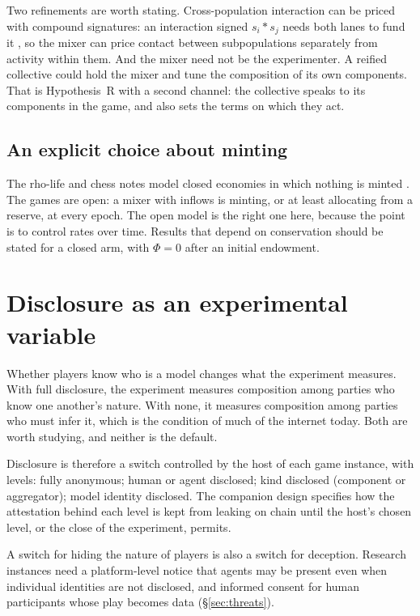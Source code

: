 \documentclass[11pt,a4paper]{article}
\begin{document}
Two refinements are worth stating. Cross-population interaction can be priced with compound
signatures: an interaction signed $s_i * s_j$ needs both lanes to fund it \cite[\S4.6]{cost-rho},
so the mixer can price contact between subpopulations separately from activity within them. And
the mixer need not be the experimenter. A reified collective could hold the mixer and tune the
composition of its own components. That is Hypothesis~R with a second channel: the collective
speaks to its components in the game, and also sets the terms on which they act.

\subsection{An explicit choice about minting}

The rho-life and chess notes model closed economies in which nothing is minted
\cite{rholife-scientist,chess-note}. The games are open: a mixer with inflows is minting, or at
least allocating from a reserve, at every epoch. The open model is the right one here, because the
point is to control rates over time. Results that depend on conservation should be stated for a
closed arm, with $\Phi=0$ after an initial endowment.

\section{Disclosure as an experimental variable}\label{sec:disclosure}

Whether players know who is a model changes what the experiment measures. With full disclosure,
the experiment measures composition among parties who know one another's nature. With none, it
measures composition among parties who must infer it, which is the condition of much of the
internet today. Both are worth studying, and neither is the default.

Disclosure is therefore a switch controlled by the host of each game instance, with levels: fully
anonymous; human or agent disclosed; kind disclosed (component or aggregator); model identity
disclosed. The companion design specifies how the attestation behind each level is kept from
leaking on chain until the host's chosen level, or the close of the experiment, permits.

A switch for hiding the nature of players is also a switch for deception. Research instances need
a platform-level notice that agents may be present even when individual identities are not
disclosed, and informed consent for human participants whose play becomes data
(\S\ref{sec:threats}).
\end{document}
